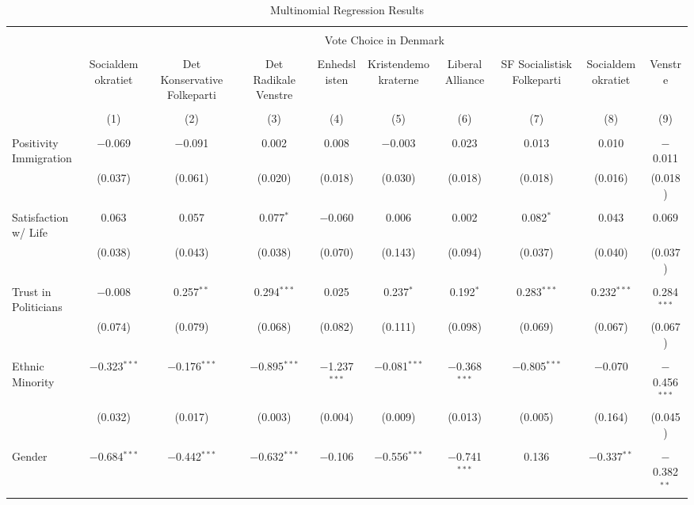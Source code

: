 \documentclass[
  letterpaper,
  DIV=11,
  numbers=noendperiod]{scrreprt}
\begin{document}
\blandscape
\begin{table}[H] \centering 
  \caption{Multinomial Regression Results} 
  \label{} 
\tiny 
\begin{tabular}{@{\extracolsep{-15pt}}lccccccccc} 
\\[-1.8ex]\hline 
\hline \\[-1.8ex] 
 & \multicolumn{9}{c}{Vote Choice in Denmark} \\ 
\cline{2-10} 
\\[-1.8ex] & Socialdemokratiet & Det Konservative Folkeparti & Det Radikale Venstre & Enhedslisten & Kristendemokraterne & Liberal Alliance & SF Socialistisk Folkeparti & Socialdemokratiet & Venstre \\ 
\\[-1.8ex] & (1) & (2) & (3) & (4) & (5) & (6) & (7) & (8) & (9)\\ 
\hline \\[-1.8ex] 
 Positivity Immigration & $-$0.069 & $-$0.091 & 0.002 & 0.008 & $-$0.003 & 0.023 & 0.013 & 0.010 & $-$0.011 \\ 
  & (0.037) & (0.061) & (0.020) & (0.018) & (0.030) & (0.018) & (0.018) & (0.016) & (0.018) \\ 
  & & & & & & & & & \\ 
 Satisfaction w/ Life & 0.063 & 0.057 & 0.077$^{*}$ & $-$0.060 & 0.006 & 0.002 & 0.082$^{*}$ & 0.043 & 0.069 \\ 
  & (0.038) & (0.043) & (0.038) & (0.070) & (0.143) & (0.094) & (0.037) & (0.040) & (0.037) \\ 
  & & & & & & & & & \\ 
 Trust in Politicians & $-$0.008 & 0.257$^{**}$ & 0.294$^{***}$ & 0.025 & 0.237$^{*}$ & 0.192$^{*}$ & 0.283$^{***}$ & 0.232$^{***}$ & 0.284$^{***}$ \\ 
  & (0.074) & (0.079) & (0.068) & (0.082) & (0.111) & (0.098) & (0.069) & (0.067) & (0.067) \\ 
  & & & & & & & & & \\ 
 Ethnic Minority & $-$0.323$^{***}$ & $-$0.176$^{***}$ & $-$0.895$^{***}$ & $-$1.237$^{***}$ & $-$0.081$^{***}$ & $-$0.368$^{***}$ & $-$0.805$^{***}$ & $-$0.070 & $-$0.456$^{***}$ \\ 
  & (0.032) & (0.017) & (0.003) & (0.004) & (0.009) & (0.013) & (0.005) & (0.164) & (0.045) \\ 
  & & & & & & & & & \\ 
 Gender & $-$0.684$^{***}$ & $-$0.442$^{***}$ & $-$0.632$^{***}$ & $-$0.106 & $-$0.556$^{***}$ & $-$0.741$^{***}$ & 0.136 & $-$0.337$^{**}$ & $-$0.382$^{**}$ \\ 

\end{tabular}
\end{table}
\end{document}
